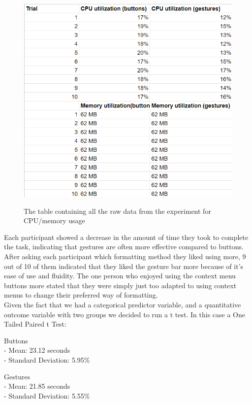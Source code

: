 \documentclass[conference]{IEEEtran}
\begin{document}
\begin{figure}[ht]
    \centering
    \includegraphics[scale=0.5]{images/cputable.png}\\
    \caption{The table containing all the raw data from the experiment for CPU/memory usage}
    \label{fig:enter-label}
\end{figure}

Each participant showed a decrease in the amount of time they took to complete the task, indicating that gestures are often more effective compared to buttons. After asking each participant which formatting method they liked using more, 9 out of 10 of them indicated that they liked the gesture bar more because of it's ease of use and fluidity. The one person who enjoyed using the context menu buttons more stated that they were simply just too adapted to using context menus to change their preferred way of formatting.\\

Given the fact that we had a categorical predictor variable, and a quantitative outcome variable with two groups we decided to run a t test. In this case a One Tailed Paired t Test:


Buttons\\
- Mean: 23.12 seconds\\
- Standard Deviation: 5.95\%

Gestures\\
- Mean: 21.85 seconds\\
- Standard Deviation: 5.55\%
\end{document}
